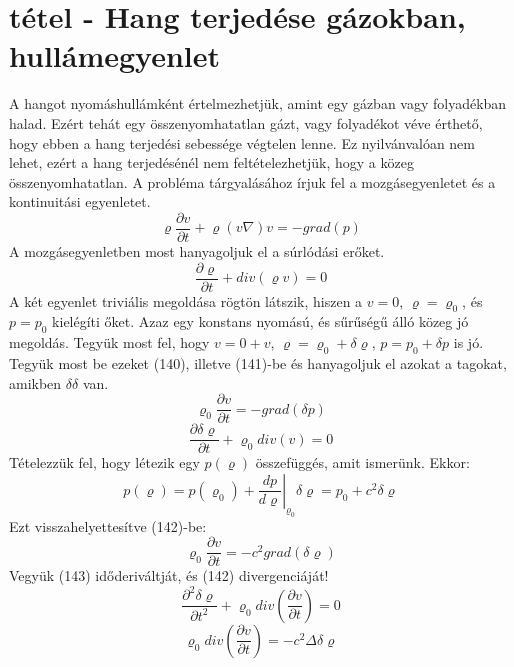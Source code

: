 \documentclass[a4paper,12pt]{article}
\begin{document}
\section{tétel - Hang terjedése gázokban, hullámegyenlet}
A hangot nyomáshullámként értelmezhetjük, amint egy gázban vagy folyadékban halad. Ezért tehát egy összenyomhatatlan gázt, vagy folyadékot véve érthető, hogy ebben a hang terjedési sebessége végtelen lenne. Ez nyilvánvalóan nem lehet, ezért a hang terjedésénél nem feltételezhetjük, hogy a közeg összenyomhatatlan. A probléma tárgyalásához írjuk fel a mozgásegyenletet és a kontinuitási egyenletet.
\begin{equation}
\varrho\frac{\partial v}{\partial t}+\varrho(v\nabla)v=-grad(p)
\end{equation}
A mozgásegyenletben most hanyagoljuk el a súrlódási erőket.
\begin{equation}
\frac{\partial\varrho}{\partial t}+div(\varrho v)=0
\end{equation}
A két egyenlet triviális megoldása rögtön látszik, hiszen a $v=0$, $\varrho=\varrho_0$, és $p=p_0$ kielégíti őket. Azaz egy konstans nyomású, és sűrűségű álló közeg jó megoldás. Tegyük most fel, hogy $v=0+v$, $\varrho=\varrho_0+\delta\varrho$, $p=p_0+\delta p$ is jó. Tegyük most be ezeket (140), illetve (141)-be és hanyagoljuk el azokat a tagokat, amikben $\delta\delta$ van.
\begin{equation}
\varrho_0\frac{\partial v}{\partial t}=-grad(\delta p)
\end{equation}
\begin{equation}
\frac{\partial\delta\varrho}{\partial t}+\varrho_0div(v)=0
\end{equation}
Tételezzük fel, hogy létezik egy $p(\varrho)$ összefüggés, amit ismerünk. Ekkor:
\begin{equation}
p(\varrho)=p(\varrho_0)+\left.\frac{dp}{d\varrho}\right|_{\varrho_0}\delta\varrho=p_0+c^2\delta\varrho
\end{equation}
Ezt visszahelyettesítve (142)-be:
\begin{equation}
\varrho_0\frac{\partial v}{\partial t}=-c^2grad(\delta\varrho)
\end{equation}
Vegyük (143) időderiváltját, és (142) divergenciáját!
\begin{equation}
\frac{\partial^2\delta\varrho}{\partial t^2}+\varrho_0div\left(\frac{\partial v}{\partial t}\right)=0
\end{equation}
\begin{equation}
\varrho_0div\left(\frac{\partial v}{\partial t}\right)=-c^2\Delta\delta\varrho
\end{equation}
\end{document}
